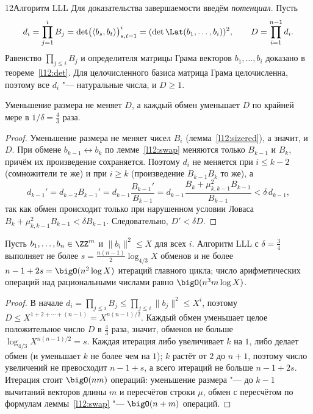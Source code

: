 \begin{lecture}{12}{Алгоритм LLL}
Для доказательства завершаемости введём \emph{потенциал}. Пусть
\[
  d_i = \prod_{j=1}^{i} B_j = \det\bigl(\langle b_s, b_t \rangle\bigr)_{s,t=1}^{i}
  = (\det \Lat(b_1, \dots, b_i))^2, \qquad D = \prod_{i=1}^{n-1} d_i .
\]
Равенство $\prod_{j \le i} B_j$ и определителя матрицы Грама векторов $b_1, \dots, b_i$
доказано в теореме~\ref{l12:det}. Для целочисленного базиса матрица Грама целочисленна,
поэтому все $d_i$ "--- натуральные числа, и $D \ge 1$.

\begin{theorem}\label{l12:potential}
Уменьшение размера не меняет $D$, а каждый обмен уменьшает $D$ по крайней мере в
$1/\delta = \frac43$ раза.
\end{theorem}

\begin{proof}
Уменьшение размера не меняет чисел $B_i$ (лемма~\ref{l12:sizered}), а значит, и $D$. При
обмене $b_{k-1} \leftrightarrow b_k$ по лемме~\ref{l12:swap} меняются только $B_{k-1}$ и $B_k$,
причём их произведение сохраняется. Поэтому $d_i$ не меняется при $i \le k - 2$ (сомножители те
же) и при $i \ge k$ (произведение $B_{k-1}B_k$ то же), а
\[
  d_{k-1}' = d_{k-2} B_{k-1}' = d_{k-1} \frac{B_{k-1}'}{B_{k-1}}
  = d_{k-1} \frac{B_k + \mu_{k,k-1}^2 B_{k-1}}{B_{k-1}} < \delta\, d_{k-1},
\]
так как обмен происходит только при нарушенном условии Ловаса
$B_k + \mu_{k,k-1}^2 B_{k-1} < \delta B_{k-1}$. Следовательно, $D' < \delta D$.
\end{proof}

\begin{theorem}\label{l12:termination}
Пусть $b_1, \dots, b_n \in \ZZ^m$ и $\|b_i\|^2 \le X$ для всех $i$. Алгоритм LLL с
$\delta = \frac34$ выполняет не более $s = \frac{n(n-1)}{2} \log_{4/3} X$ обменов и не более
$n - 1 + 2s = \bigO(n^2 \log X)$ итераций главного цикла; число арифметических операций над
рациональными числами равно $\bigO(n^3 m \log X)$.
\end{theorem}

\begin{proof}
В начале $d_i = \prod_{j \le i} B_j \le \prod_{j \le i} \|b_j\|^2 \le X^i$, поэтому
$D \le X^{1 + 2 + \cdots + (n-1)} = X^{n(n-1)/2}$. Каждый обмен уменьшает целое
положительное число $D$ в $\frac43$ раза, значит, обменов не больше
$\log_{4/3} X^{n(n-1)/2} = s$. Каждая итерация либо увеличивает $k$ на $1$, либо делает обмен
(и уменьшает $k$ не более чем на $1$); $k$ растёт от $2$ до $n + 1$, поэтому число
увеличений не превосходит $n - 1 + s$, а всего итераций не больше $n - 1 + 2s$. Итерация
стоит $\bigO(nm)$ операций: уменьшение размера "--- до $k - 1$ вычитаний векторов длины $m$
и пересчётов строки $\mu$, обмен с пересчётом по формулам леммы~\ref{l12:swap} "--- $\bigO(n +
m)$ операций.
\end{proof}


\end{lecture}

